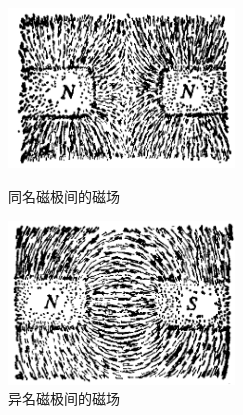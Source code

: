 \begin{figure}[H]%
    \centering
    \begin{minipage}{7cm}
    \centering
    \includegraphics[width=6cm]{../pic/czwl2-ch10-11}
    \caption{同名磁极间的磁场}\label{fig:10-11}
    \end{minipage}
    \qquad
    \begin{minipage}{7cm}
    \centering
    \includegraphics[width=6cm]{../pic/czwl2-ch10-12}
    \caption{异名磁极间的磁场}\label{fig:10-12}
    \end{minipage}
\end{figure}

